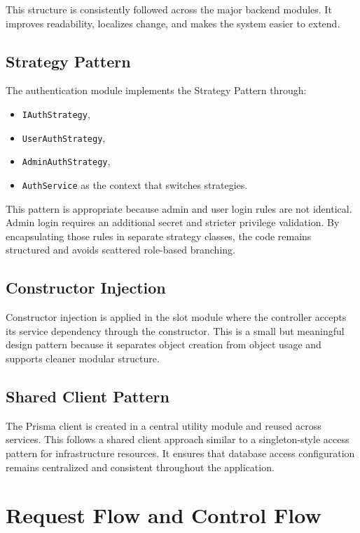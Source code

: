 \documentclass[12pt,a4paper]{article}
\begin{document}
This structure is consistently followed across the major backend modules. It improves readability, localizes change, and makes the system easier to extend.

\subsection{Strategy Pattern}
The authentication module implements the Strategy Pattern through:
\begin{itemize}
    \item \texttt{IAuthStrategy},
    \item \texttt{UserAuthStrategy},
    \item \texttt{AdminAuthStrategy},
    \item \texttt{AuthService} as the context that switches strategies.
\end{itemize}

This pattern is appropriate because admin and user login rules are not identical. Admin login requires an additional secret and stricter privilege validation. By encapsulating those rules in separate strategy classes, the code remains structured and avoids scattered role-based branching.

\subsection{Constructor Injection}
Constructor injection is applied in the slot module where the controller accepts its service dependency through the constructor. This is a small but meaningful design pattern because it separates object creation from object usage and supports cleaner modular structure.

\subsection{Shared Client Pattern}
The Prisma client is created in a central utility module and reused across services. This follows a shared client approach similar to a singleton-style access pattern for infrastructure resources. It ensures that database access configuration remains centralized and consistent throughout the application.

\section{Request Flow and Control Flow}
\end{document}
